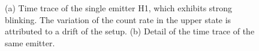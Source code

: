 		\begin{figure}[!htb]
			\begin{subfigure}[tp]{ 0.49\linewidth}
				\centering
				\caption{}\label{subfig::blink_long}
			\end{subfigure}
			\hfill
			\begin{subfigure}[tp]{ 0.49\linewidth}
				\centering
				\caption{}\label{subfig::blink_short}
			\end{subfigure}
			\caption[Time trace of a single emitter.]{(a) Time trace of the single emitter H1, which exhibits strong blinking. The variation of the count rate in the upper state is attributed to a drift of the setup. (b) Detail of the time trace of the same emitter.}
			\label{fig::blink}
		\end{figure}

